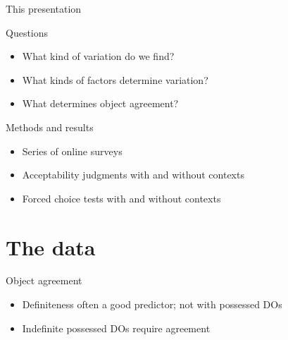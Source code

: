 \documentclass[12pt]{beamer}
\begin{document}
\begin{frame}{This presentation}

    \begin{block}{Questions}

        \begin{itemize}

        \item What kind of variation do we find?

        \item What kinds of factors determine variation?

        \item What determines object agreement?

        \end{itemize}

    \end{block}

    \begin{block}{Methods and results}

        \begin{itemize}

            \item Series of online surveys

            \item Acceptability judgments with and without contexts

            \item Forced choice tests with and without contexts

        \end{itemize}
    \end{block}

\end{frame}

\section{The data}

\begin{frame}{Object agreement}

    \begin{itemize}

        \item Definiteness often a good predictor; not with possessed DOs

        \item Indefinite possessed DOs require agreement

    \end{itemize}


\end{frame}
\end{document}
